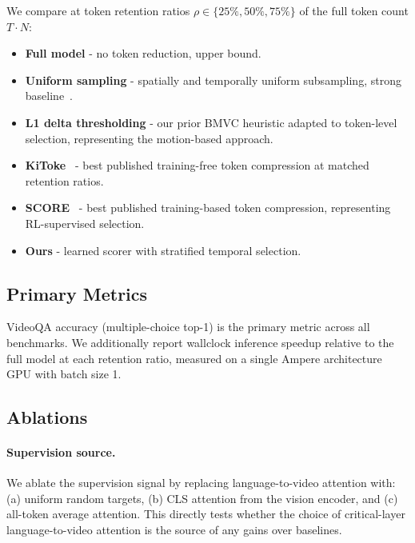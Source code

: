 \documentclass[12pt]{article}
\begin{document}
We compare at token retention ratios $\rho \in \{25\%, 50\%, 75\%\}$
of the full token count $T \cdot N$:
 
\begin{itemize}
    \item \textbf{Full model} - no token reduction, upper bound.
    \item \textbf{Uniform sampling} - spatially and temporally
    uniform subsampling, strong baseline~\parencite{steunou2026peekpickingessentialframes}.
    \item \textbf{L1 delta thresholding} - our prior BMVC heuristic
    adapted to token-level selection, representing the motion-based
    approach.
    \item \textbf{KiToke}~\parencite{huang2026kitokekernelbasedintervalawaretoken} - best
    published training-free token compression at matched retention
    ratios.
    \item \textbf{SCORE}~\parencite{wang2026dynamictokencompressionefficient} - best published
    training-based token compression, representing RL-supervised
    selection.
    \item \textbf{Ours} - learned scorer with stratified temporal
    selection.
\end{itemize}
 
\subsection{Primary Metrics}
 
VideoQA accuracy (multiple-choice top-1) is the primary metric across
all benchmarks. We additionally report wallclock inference speedup
relative to the full model at each retention ratio, measured on a
single Ampere architecture GPU with batch size 1.
 
\subsection{Ablations}
 
\paragraph{Supervision source.}
We ablate the supervision signal by replacing language-to-video
attention with: (a) uniform random targets, (b) CLS attention from the
vision encoder, and (c) all-token average attention. This directly
tests whether the choice of critical-layer language-to-video attention
is the source of any gains over baselines.
 
\end{document}
